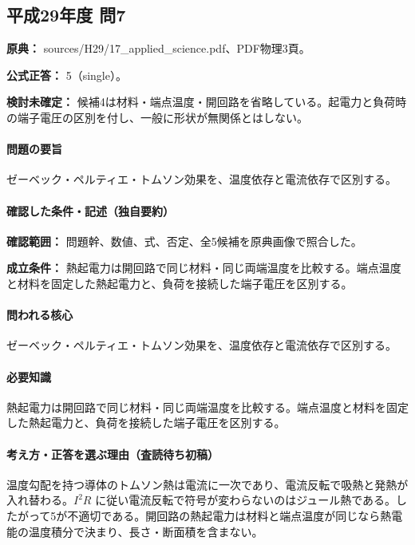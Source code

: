 \subsection{平成29年度 問7}
\label{q:h29-reg-applied-07}

\noindent\textbf{原典：} sources/H29/17\_applied\_science.pdf、PDF物理3頁。

\textbf{公式正答：} 5（single）。

\par\textbf{検討未確定：} 候補4は材料・端点温度・開回路を省略している。起電力と負荷時の端子電圧の区別を付し、一般に形状が無関係とはしない。

\paragraph{問題の要旨} ゼーベック・ペルティエ・トムソン効果を、温度依存と電流依存で区別する。

\paragraph{確認した条件・記述（独自要約）}\mbox{}\par

\noindent\textbf{確認範囲：} 問題幹、数値、式、否定、全5候補を原典画像で照合した。\par

\noindent\textbf{成立条件：} 熱起電力は開回路で同じ材料・同じ両端温度を比較する。端点温度と材料を固定した熱起電力と、負荷を接続した端子電圧を区別する。\par

\paragraph{問われる核心} ゼーベック・ペルティエ・トムソン効果を、温度依存と電流依存で区別する。

\paragraph{必要知識} 熱起電力は開回路で同じ材料・同じ両端温度を比較する。端点温度と材料を固定した熱起電力と、負荷を接続した端子電圧を区別する。

\paragraph{考え方・正答を選ぶ理由（査読待ち初稿）} 温度勾配を持つ導体のトムソン熱は電流に一次であり、電流反転で吸熱と発熱が入れ替わる。\(I^2R\) に従い電流反転で符号が変わらないのはジュール熱である。したがって5が不適切である。開回路の熱起電力は材料と端点温度が同じなら熱電能の温度積分で決まり、長さ・断面積を含まない。

